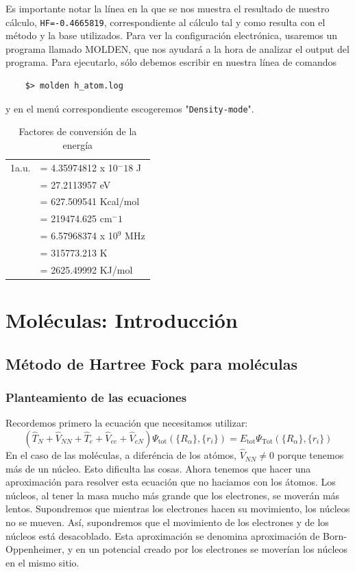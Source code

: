 \documentclass{tufte-book}
\begin{document}
Es importante notar la línea en la que se nos muestra el resultado
de nuestro cálculo, \texttt{HF=-0.4665819}, correspondiente
al cálculo tal y como resulta con el método y la base utilizados.
Para ver la configuración electrónica, usaremos un programa 
llamado MOLDEN, que nos ayudará a la hora de analizar el output
del programa. Para ejecutarlo, sólo debemos escribir en nuestra
línea de comandos
\begin{verbatim}
    $> molden h_atom.log
\end{verbatim}
y en el menú correspondiente escogeremos "\texttt{Density-mode}".

\begin{table}[h!]
\centering
	\scriptsize
	\begin{tabular}{ll}
     \toprule
		1a.u. & =  4.35974812 x 10$^−18$ J  \\
		         &  =  27.2113957 eV \\
	             &  = 627.509541 Kcal/mol \\ 
		         & = 219474.625 cm$^−1$ \\ 
		        & = 6.57968374 x 10$^9$ MHz \\ 
		        & = 315773.213 K \\
		        & = 2625.49992 KJ/mol \\ 
    \bottomrule
    \end{tabular}
    \caption{Factores de conversión de la energía}
    \label{tb:commands}
\end{table}

\chapter{Moléculas: Introducción}
\section{Método de Hartree Fock para moléculas}
\subsection{Planteamiento de las ecuaciones}
Recordemos primero la ecuación que necesitamos utilizar:
\begin{equation}
    (\hat{T}_N + \hat{V}_{NN} + \hat{T}_e + \hat{V}_{ee} +\hat{V}_{eN})\Psi_\mathrm{tot}(\{R_\alpha\},\{r_i\}) 
    = E_\mathrm{tot}\Psi_\mathrm{Tot}(\{R_\alpha\},\{r_i\}) 
\end{equation}
En el caso de las moléculas, a diferéncia de los atómos,  $\hat{V}_{NN}\neq0$ porque tenemos más de un núcleo. Esto dificulta las cosas. Ahora tenemos que hacer una aproximación para resolver esta ecuación que no haciamos con los átomos. Los núcleos, al tener la masa mucho más grande que los electrones, se moverán más lentos. Supondremos que mientras los electrones hacen su movimiento, los núcleos no se mueven. Así, supondremos que el movimiento de los electrones y de los núcleos está desacoblado. Esta aproximación se denomina aproximación de Born-Oppenheimer, y en un potencial creado por los electrones se moverían los núcleos en el mismo sitio. 
\end{document}
